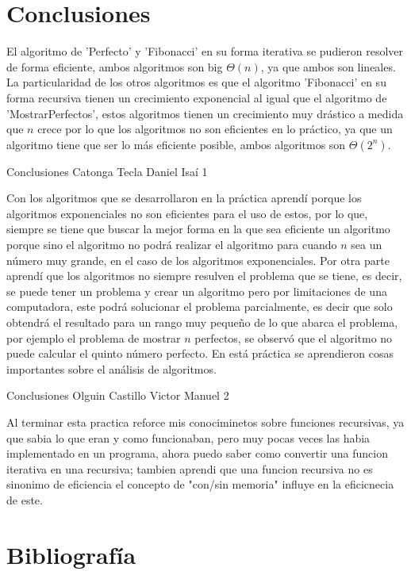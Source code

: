 \documentclass[12pt,twoside]{article}
\begin{document}
\section{Conclusiones}

El algoritmo de 'Perfecto' y 'Fibonacci' en su forma iterativa se pudieron resolver de forma eficiente, ambos algoritmos son big $\Theta(n)$, ya que ambos son lineales. La particularidad de los otros algoritmos es que el algoritmo 'Fibonacci' en su forma recursiva
tienen un crecimiento exponencial al igual que el algoritmo de 'MostrarPerfectos', estos algoritmos tienen un crecimiento muy drástico a medida que $n$ crece por lo que los algoritmos no son eficientes en lo práctico, ya que un algoritmo tiene que ser lo más eficiente posible, ambos algoritmos son $\Theta(2^n)$.

\medskip

Conclusiones Catonga Tecla Daniel Isaí 1
\par
Con los algoritmos que se desarrollaron en la práctica aprendí porque los algoritmos exponenciales no son eficientes para el uso de estos, por lo que, siempre se tiene que buscar la mejor forma en la que sea eficiente un algoritmo porque sino el algoritmo no podrá realizar el algoritmo para cuando $n$ sea un número muy grande, en el caso de los algoritmos exponenciales. Por otra parte
aprendí que los algoritmos no siempre resulven el problema que se tiene, es decir, se puede tener un problema y crear un algoritmo pero por limitaciones de una computadora, este podrá solucionar el problema parcialmente, es decir que solo obtendrá el resultado para un rango muy pequeño de lo que abarca el problema, por ejemplo el problema de mostrar $n$ perfectos, se observó que el algoritmo no
puede calcular el quinto número perfecto. En está práctica se aprendieron cosas importantes sobre el análisis de algoritmos.

\medskip

Conclusiones Olguin Castillo Victor Manuel 2
\par
Al terminar esta practica reforce mis conociminetos sobre funciones recursivas, ya que sabia lo que eran y como funcionaban, pero muy pocas veces las habia implementado en un programa, ahora puedo saber como convertir una funcion iterativa en una recursiva; tambien aprendi que una funcion recursiva no es sinonimo de eficiencia el concepto de "con/sin memoria" influye en la eficicnecia de este.

\newpage
\section{Bibliograf\'ia}

\printbibliography[title={ }]



\medskip
\end{document}
